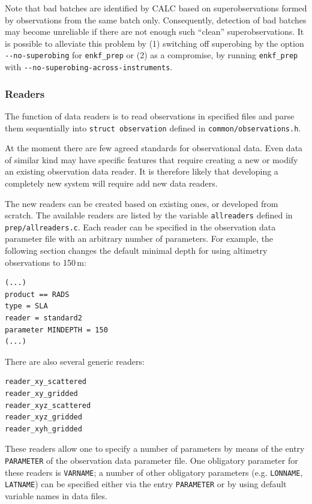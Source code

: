 \documentclass[11pt]{report}
\begin{document}
Note that bad batches are identified by CALC based on superobservations formed by observations from the same batch only.
Consequently, detection of bad batches may become unreliable if there are not enough such ``clean'' superobservations.
It is possible to alleviate this problem by (1) switching off superobing by the option \verb|--no-superobing| for \verb|enkf_prep| or (2) as a compromise, by running \verb|enkf_prep| with \verb|--no-superobing-across-instruments|.

\subsubsection{Readers}

The function of data readers is to read observations in specified files and parse them sequentially into \verb|struct observation| defined in \verb|common/observations.h|.

At the moment there are few agreed standards for observational data.
Even data of similar kind may have specific features that require creating a new or modify an existing observation data reader.
It is therefore likely that developing a completely new system will require add new data readers.

The new readers can be created based on existing ones, or developed from scratch.
The available readers are listed by the variable \verb|allreaders| defined in \verb|prep/allreaders.c|.
Each reader can be specified in the observation data parameter file with an arbitrary number of parameters.
For example, the following section changes the default minimal depth for using altimetry observations to 150\,m:
\begin{Verbatim}
(...)
product == RADS
type = SLA
reader = standard2
parameter MINDEPTH = 150
(...)
\end{Verbatim}

There are also several generic readers:
\begin{Verbatim}
reader_xy_scattered
reader_xy_gridded
reader_xyz_scattered
reader_xyz_gridded
reader_xyh_gridded
\end{Verbatim}
These readers allow one to specify a number of parameters by means of the entry \verb|PARAMETER| of the observation data parameter file.
One obligatory parameter for these readers is \verb|VARNAME|; a number of other obligatory parameters (e.g. \verb|LONNAME|, \verb|LATNAME|) can be specified either via the entry \verb|PARAMETER| or by using default variable names in data files.
\end{document}

